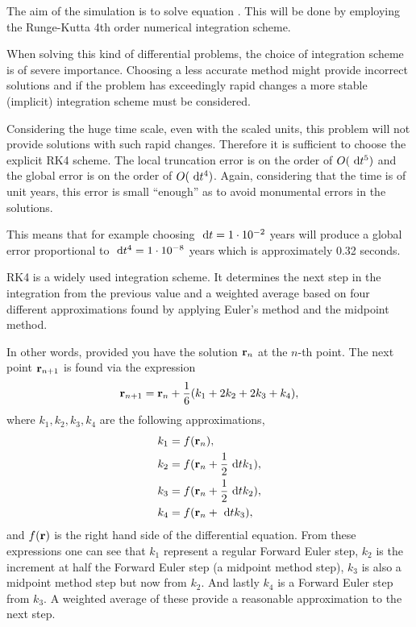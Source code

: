 The aim of the simulation is to solve equation
. This will be done by employing the
Runge-Kutta 4th order numerical integration scheme.

When solving this kind of differential problems, the choice of
integration scheme is of severe importance. Choosing a less
accurate method might provide incorrect solutions and if the
problem has exceedingly rapid changes a more stable (implicit)
integration scheme must be considered.

Considering the huge time scale, even with the scaled units, this
problem will not provide solutions with such rapid changes.
Therefore it is sufficient to choose the explicit RK4 scheme. The
local truncation error is on the order of $O(\ \mathrm{d}t^5)$ and the global
error is on the order of $O(\ \mathrm{d}t^4)$. Again, considering that the
time is of unit years, this error is small ``enough'' as to avoid
monumental errors in the solutions.

This means that for example choosing $\ \mathrm{d}t = 1 \cdot 10^{-2}$ years
will produce a global error proportional to $\ \mathrm{d}t^4 = 1 \cdot
10^{-8}$ years which is approximately 0.32 seconds.

RK4 is a widely used integration scheme. It determines the next
step in the integration from the previous value and a weighted
average based on four different approximations found by applying
Euler's method and the midpoint method.

In other words, provided you have the solution $\mathbf{r}_n$ at the
$n$-th point. The next point $\mathbf{r}_{n+1}$ is found via the expression
\[ \mathbf{r}_{n+1} = \mathbf{r}_n + \frac{1}{6}(k_1 + 2k_2 + 2k_3 + k_4), \] where 
$k_1,k_2,k_3,k_4$ are the following approximations,
\begin{align*}
    k_1 &= f(\mathbf{r}_n), \\
    k_2 &= f(\mathbf{r}_n + \frac{1}{2}\ \mathrm{d}t k_1), \\
    k_3 &= f(\mathbf{r}_n + \frac{1}{2}\ \mathrm{d}t k_2), \\
    k_4 &= f(\mathbf{r}_n + \ \mathrm{d}t k_3),
\end{align*}
and $f(\mathbf{r})$ is the right hand side of the differential equation.
From these expressions one can see that $k_1$ represent a regular
Forward Euler step, $k_2$ is the increment at half the Forward
Euler step (a midpoint method step), $k_3$ is also a midpoint
method step but now from $k_2$. And lastly $k_4$ is a Forward Euler
step from $k_3$. A weighted average of these provide a reasonable
approximation to the next step.
%

